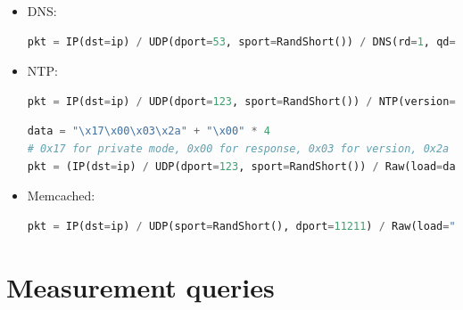 \begin{itemize}
\item DNS:
\begin{lstlisting}[language=python, caption=DNS ``A'' request., label=lst:check_dns]
pkt = IP(dst=ip) / UDP(dport=53, sport=RandShort()) / DNS(rd=1, qd=DNSQR(qname="google.com"))
\end{lstlisting}
\item NTP:
\begin{lstlisting}[language=python, caption=NTP request., label=lst:check_ntp_1]
pkt = IP(dst=ip) / UDP(dport=123, sport=RandShort()) / NTP(version=4, mode=3)
\end{lstlisting}
\begin{lstlisting}[language=python, caption=NTP ``monlist'' query., label=lst:check_ntp_2]
data = "\x17\x00\x03\x2a" + "\x00" * 4  
# 0x17 for private mode, 0x00 for response, 0x03 for version, 0x2a for monlist
pkt = (IP(dst=ip) / UDP(dport=123, sport=RandShort()) / Raw(load=data)) 
\end{lstlisting}
\item Memcached:
\begin{lstlisting}[language=python, caption=Memcached ``stats slabs'' request., label=lst:check_memcached]
pkt = IP(dst=ip) / UDP(sport=RandShort(), dport=11211) / Raw(load="\x00\x01\x00\x00\x00\x01\x00\x00stats slabs\r\n")
\end{lstlisting}

\end{itemize}




\section{Measurement queries}
\label{appendix:measurement_queries}

